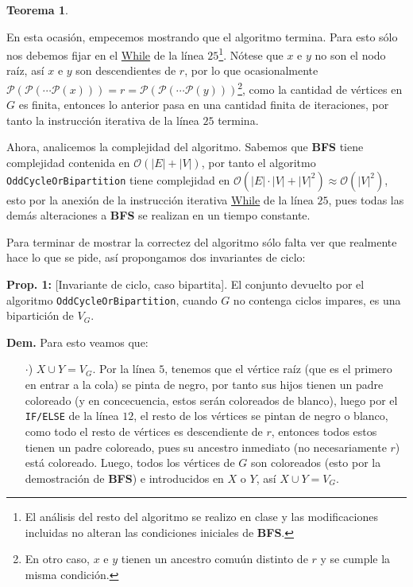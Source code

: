 \documentclass{article}
\newcommand{\code}[1]{\textcolor{white!25!black}{\texttt{#1}}}
\newtheorem*{theorem}{Teorema}
\begin{document}
\begin{enumerate}
\begin{center}
{\begin{minipage}[b][1\height]
\begin{theorem}
        \end{theorem}
    \end{minipage}}
  \end{center}
  En esta ocasi\'on, empecemos mostrando que el algoritmo termina.
  Para esto s\'olo nos debemos fijar en el \underline{While} de  la
  l\'inea $25$\footnote{El an\'alisis del resto del algoritmo se
    realizo en clase y las modificaciones incluidas no alteran las
    condiciones iniciales de \textbf{BFS}.}. N\'otese que $x$ e $y$
  no son el nodo  ra\'iz, as\'i $x$ e $y$ son descendientes de $r$,
  por lo que ocasionalmente $\mathcal{P}(\mathcal{P}(\dotsm\mathcal{P}
  (x))) = r = \mathcal{P}(\mathcal{P}(\dotsm\mathcal{P}(y)))$\footnote{En
    otro caso, $x$ e $y$ tienen un ancestro comu\'un distinto de $r$
    y se cumple la misma condici\'on.}, como la cantidad de v\'ertices
  en $G$ es finita, entonces lo anterior pasa en una cantidad finita
  de iteraciones, por tanto la instrucci\'on iterativa de la l\'inea
  $25$ termina.
  
  Ahora, analicemos la complejidad del algoritmo. Sabemos que \textbf{BFS}
  tiene complejidad contenida en $\mathcal{O}(|E| + |V|)$, por tanto el
  algoritmo \code{OddCycleOrBipartition} tiene complejidad en $\mathcal{O}
  (|E|\cdot|V| + |V|^2) \approx \mathcal{O}(|V|^2)$, esto por la anexi\'on
  de la instrucci\'on iterativa \underline{While} de la l\'inea $25$, pues
  todas las dem\'as alteraciones a \textbf{BFS} se realizan en un tiempo constante.
  
  Para terminar de mostrar la correctez del algoritmo sólo falta ver que
  realmente hace lo que se pide, as\'i propongamos dos invariantes de ciclo:
  
  \textbf{Prop. 1:} [Invariante de ciclo, caso bipartita]. El conjunto
  devuelto por el algoritmo \code{OddCycleOrBipartition}, cuando $G$
  no contenga ciclos impares, es una bipartici\'on de $V_G$.  
  
  \textbf{Dem.}   Para esto veamos que:
  \begin{itemize}
  \item[$\cdot$)] $X\cup Y = V_G$. Por la l\'inea $5$, tenemos que el
    v\'ertice ra\'iz (que es el primero en entrar a la cola) se pinta
    de negro, por tanto sus hijos tienen un padre coloreado (y en concecuencia,
    estos ser\'an coloreados de blanco), luego por el \code{IF/ELSE}
    de la l\'inea $12$, el resto de los v\'ertices se pintan de negro
    o blanco, como todo el resto de v\'ertices es descendiente de $r$,
    entonces todos estos tienen un padre coloreado, pues su ancestro
    inmediato (no necesariamente $r$) est\'a coloreado. Luego, todos
    los v\'ertices de $G$ son coloreados (esto por la demostraci\'on de
    \textbf{BFS}) e introducidos en $X$ o $Y$, as\'i $X\cup Y = V_G$.
    

\end{itemize}
\end{enumerate}
\end{document}
